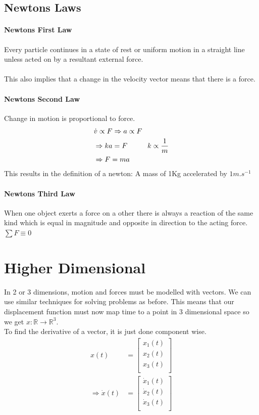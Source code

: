 \documentclass[a4paper,12pt]{article}
\begin{document}
\subsection*{Newtons Laws}
\paragraph*{Newtons First Law}
Every particle continues in a state of rest or uniform motion in a straight line unless acted on by a resultant external force. \\\\
This also implies that a change in the velocity vector means that there is a force. 

\paragraph*{Newtons Second Law}
Change in motion is proportional to force. \\
\begin{align*}
& \dot{v} \propto F \Rightarrow a \propto F \\
& \Rightarrow ka = F \hspace*{1cm} k \propto \frac{1}{m} \\
& \Rightarrow F = ma \\
\end{align*}
This results in the definition of a newton: A mass of 1Kg accelerated by $1m.s^{-1}$

\paragraph*{Newtons Third Law}
When one object exerts a force on a other there is always a reaction of the same kind which is equal in magnitude and opposite in direction to the acting force. $\sum F \equiv 0$

\section*{Higher Dimensional}
In 2 or 3 dimensions, motion and forces must be modelled with vectors. We can use similar techniques for solving problems as before. This means that our displacement function must now map time to a point in 3 dimensional space so we get $x: \mathbb{R} \to \mathbb{R}^3$. \\

To find the derivative of a vector, it is just done component wise. 
\begin{align*}
x(t) & = \begin{bmatrix}
	x_1(t) \\
	x_2(t) \\
	x_3(t) \\
\end{bmatrix} \\
\Rightarrow \dot{x}(t) & = \begin{bmatrix}
	\dot{x}_1(t) \\
	\dot{x}_2(t) \\
	\dot{x}_3(t) \\
\end{bmatrix} \\
\end{align*}
\end{document}

